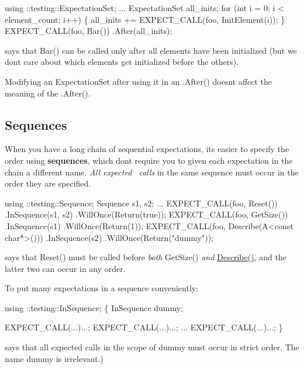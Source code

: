\begin{DoxyCode}
using ::testing::ExpectationSet;
...
ExpectationSet all\_inits;
for (int i = 0; i < element\_count; i++) \{
  all\_inits += EXPECT\_CALL(foo, InitElement(i));
\}
EXPECT\_CALL(foo, Bar())
    .After(all\_inits);
\end{DoxyCode}
 says that {\ttfamily Bar()} can be called only after all elements have been initialized (but we don\textquotesingle{}t care about which elements get initialized before the others).

Modifying an {\ttfamily Expectation\+Set} after using it in an {\ttfamily .After()} doesn\textquotesingle{}t affect the meaning of the {\ttfamily .After()}.

\subsection*{Sequences}

When you have a long chain of sequential expectations, it\textquotesingle{}s easier to specify the order using {\bfseries sequences}, which don\textquotesingle{}t require you to given each expectation in the chain a different name. {\itshape All expected~\newline
 calls} in the same sequence must occur in the order they are specified.


\begin{DoxyCode}
using ::testing::Sequence;
Sequence s1, s2;
...
EXPECT\_CALL(foo, Reset())
    .InSequence(s1, s2)
    .WillOnce(Return(true));
EXPECT\_CALL(foo, GetSize())
    .InSequence(s1)
    .WillOnce(Return(1));
EXPECT\_CALL(foo, Describe(A<const char*>()))
    .InSequence(s2)
    .WillOnce(Return("dummy"));
\end{DoxyCode}
 says that {\ttfamily Reset()} must be called before {\itshape both} {\ttfamily Get\+Size()} {\itshape and} {\ttfamily \hyperlink{namespacetesting_1_1gmock__matchers__test_a36ae44e4f6c8e9fe3fe9162132503717}{Describe()}}, and the latter two can occur in any order.

To put many expectations in a sequence conveniently\+: 
\begin{DoxyCode}
using ::testing::InSequence;
\{
  InSequence dummy;

  EXPECT\_CALL(...)...;
  EXPECT\_CALL(...)...;
  ...
  EXPECT\_CALL(...)...;
\}
\end{DoxyCode}
 says that all expected calls in the scope of {\ttfamily dummy} must occur in strict order. The name {\ttfamily dummy} is irrelevant.)

